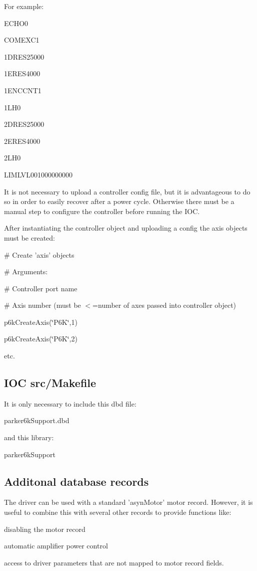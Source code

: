 For example: {\ttfamily \par
 ECHO0\par
 COMEXC1\par
 1DRES25000\par
 1ERES4000\par
 1ENCCNT1\par
 1LH0\par
 2DRES25000\par
 2ERES4000\par
 2LH0\par
 LIMLVL001000000000\par
 }

It is not necessary to upload a controller config file, but it is advantageous to do so in order to easily recover after a power cycle. Otherwise there must be a manual step to configure the controller before running the IOC.

After instantiating the controller object and uploading a config the axis objects must be created:

{\ttfamily  \# Create 'axis' objects\par
 \# Arguments:\par
 \# Controller port name\par
 \# Axis number (must be $<$=number of axes passed into controller object)\par
 p6kCreateAxis(\char`\"{}P6K\char`\"{},1)\par
 p6kCreateAxis(\char`\"{}P6K\char`\"{},2)\par
 etc. }\hypertarget{index_src_makefile}{}\subsection{IOC src/Makefile}\label{index_src_makefile}
It is only necessary to include this dbd file:

{\ttfamily  parker6kSupport.dbd }

and this library:

{\ttfamily  parker6kSupport }\hypertarget{index_records}{}\subsection{Additonal database records}\label{index_records}
The driver can be used with a standard 'asynMotor' motor record. However, it is useful to combine this with several other records to provide functions like:


\begin{DoxyItemize}
\item disabling the motor record 
\item automatic amplifier power control 
\item access to driver parameters that are not mapped to motor record fields. 
\end{DoxyItemize}

